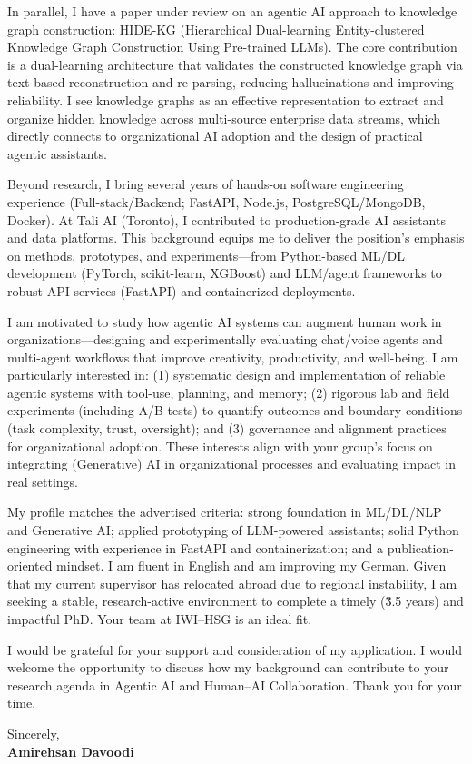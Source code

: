\documentclass[11pt]{article}
\begin{document}
In parallel, I have a paper under review on an agentic AI approach to knowledge graph construction: HIDE-KG (Hierarchical Dual-learning Entity-clustered Knowledge Graph Construction Using Pre-trained LLMs). The core contribution is a dual-learning architecture that validates the constructed knowledge graph via text-based reconstruction and re-parsing, reducing hallucinations and improving reliability. I see knowledge graphs as an effective representation to extract and organize hidden knowledge across multi-source enterprise data streams, which directly connects to organizational AI adoption and the design of practical agentic assistants.

Beyond research, I bring several years of hands-on software engineering experience (Full-stack/Backend; FastAPI, Node.js, PostgreSQL/MongoDB, Docker). At Tali AI (Toronto), I contributed to production-grade AI assistants and data platforms. This background equips me to deliver the position's emphasis on methods, prototypes, and experiments---from Python-based ML/DL development (PyTorch, scikit-learn, XGBoost) and LLM/agent frameworks to robust API services (FastAPI) and containerized deployments.

I am motivated to study how agentic AI systems can augment human work in organizations---designing and experimentally evaluating chat/voice agents and multi-agent workflows that improve creativity, productivity, and well-being. I am particularly interested in: (1) systematic design and implementation of reliable agentic systems with tool-use, planning, and memory; (2) rigorous lab and field experiments (including A/B tests) to quantify outcomes and boundary conditions (task complexity, trust, oversight); and (3) governance and alignment practices for organizational adoption. These interests align with your group's focus on integrating (Generative) AI in organizational processes and evaluating impact in real settings.

My profile matches the advertised criteria: strong foundation in ML/DL/NLP and Generative AI; applied prototyping of LLM-powered assistants; solid Python engineering with experience in FastAPI and containerization; and a publication-oriented mindset. I am fluent in English and am improving my German. Given that my current supervisor has relocated abroad due to regional instability, I am seeking a stable, research-active environment to complete a timely (\~3.5 years) and impactful PhD. Your team at IWI--HSG is an ideal fit.

I would be grateful for your support and consideration of my application. I would welcome the opportunity to discuss how my background can contribute to your research agenda in Agentic AI and Human--AI Collaboration. Thank you for your time.

Sincerely,\\[6pt]
\textbf{Amirehsan Davoodi}
\end{document}
